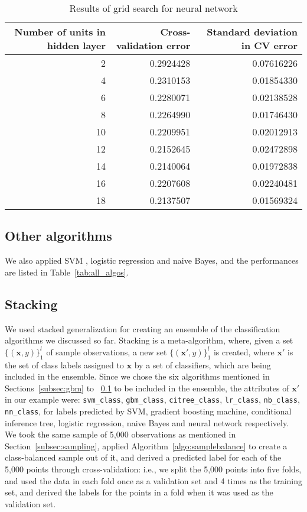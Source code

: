 \begin{table*}[!h]
\centering
\caption{Results of grid search for neural network}
\begin{tabular}{rrr}
\hline
Number of units in hidden layer & Cross-validation error & Standard deviation in CV error\\
\hline
2 & 0.2924428 & 0.07616226\\
4 & 0.2310153 & 0.01854330\\
6 & 0.2280071 & 0.02138528\\
8 & 0.2264990 & 0.01746430\\
10 & 0.2209951 & 0.02012913\\
12 & 0.2152645 & 0.02472898\\
14 & 0.2140064 & 0.01972838\\
16 & 0.2207608 & 0.02240481\\
18 & 0.2137507 & 0.01569324\\
\hline
\end{tabular}
\label{tab:nn_cv}
\end{table*}

\subsection{Other algorithms}
\label{subsec:other_algos}
We also applied SVM \cite{CV95}, logistic regression and naive Bayes, and the performances are listed in Table~\ref{tab:all_algos}. 

\subsection{Stacking}
\label{subsec:stacking}
We used stacked generalization \cite{Wolpert92} for creating an ensemble of the classification algorithms we discussed so far. Stacking is a meta-algorithm, where, given a set $\{(\mathbf{x}, y)\}_1^l$ of sample observations, a new set $\{({\mathbf{x}}', y)\}_1^l$ is created, where ${\mathbf{x}}'$ is the set of class labels assigned to $\mathbf{x}$ by a set of classifiers, which are being included in the ensemble. Since we chose the six algorithms mentioned in Sections~\ref{subsec:gbm} to ~\ref{subsec:other_algos} to be included in the ensemble, the attributes of ${\mathbf{x}}'$ in our example were: \texttt{svm\_class},  \texttt{gbm\_class}, \texttt{citree\_class}, \texttt{lr\_class}, \texttt{nb\_class}, \texttt{nn\_class}, for labels predicted by SVM, gradient boosting machine, conditional inference tree, logistic regression, naive Bayes and neural network respectively. We took the same sample of 5,000 observations as mentioned in Section~\ref{subsec:sampling}, applied Algorithm~\ref{algo:samplebalance} to create a class-balanced sample out of it, and derived a predicted label for each of the 5,000 points through cross-validation: i.e., we split the 5,000 points into five folds, and used the data in each fold once as a validation set and 4 times as the training set, and derived the labels for the points in a fold when it was used as the validation set.\\


